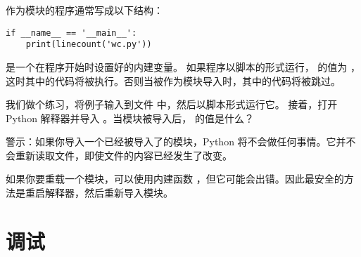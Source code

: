 {{{{{{{%

作为模块的程序通常写成以下结构：

\begin{lstlisting}
if __name__ == '__main__':
    print(linecount('wc.py'))
\end{lstlisting}

%

 是一个在程序开始时设置好的内建变量。
如果程序以脚本的形式运行， 的值为  ，这时其中的代码将被执行。否则当被作为模块导入时，其中的代码将被跳过。


我们做个练习，将例子输入到文件  中，然后以脚本形式运行它。
接着，打开 Python 解释器并导入  。当模块被导入后，  的值是什么？


警示：如果你导入一个已经被导入了的模块，Python 将不会做任何事情。它并不会重新读取文件，即使文件的内容已经发生了改变。
  


如果你要重载一个模块，可以使用内建函数  ，但它可能会出错。因此最安全的方法是重启解释器，然后重新导入模块。

\section{调试}
  

}}}}}}}
